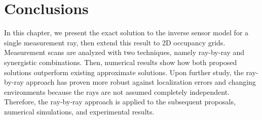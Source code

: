 



\section{Conclusions}

In this chapter, we present the exact solution to the inverse sensor model for a single measurement ray, then extend this result to 2D occupancy grids. Measurement scans are analyzed with two techniques, namely ray-by-ray and synergistic combinations. Then, numerical results show how both proposed solutions outperform existing approximate solutions. Upon further study, the ray-by-ray approach has proven more robust against localization errors and changing environments because the rays are not assumed completely independent. Therefore, the ray-by-ray approach is applied to the subsequent proposals, numerical simulations, and experimental results.






